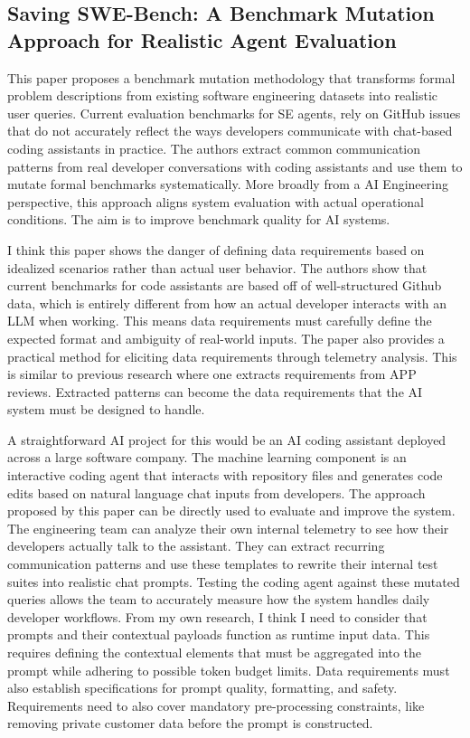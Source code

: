 \subsection{Saving SWE-Bench: A Benchmark Mutation Approach for Realistic Agent Evaluation~\cite{garg2026savingswebench}}
This paper proposes a benchmark mutation methodology that transforms formal problem descriptions from existing software engineering datasets into realistic user queries. Current evaluation benchmarks for SE agents, rely on GitHub issues that do not accurately reflect the ways developers communicate with chat-based coding assistants in practice. The authors extract common communication patterns from real developer conversations with coding assistants and use them to mutate formal benchmarks systematically. More broadly from a AI Engineering perspective, this approach aligns system evaluation with actual operational conditions. The aim is to improve benchmark quality for AI systems.

I think this paper shows the danger of defining data requirements based on idealized scenarios rather than actual user behavior. The authors show that current benchmarks for code assistants are based off of well-structured Github data, which is entirely different from how an actual developer interacts with an LLM when working. This means data requirements must carefully define the expected format and ambiguity of real-world inputs. The paper also provides a practical method for eliciting data requirements through telemetry analysis. This is similar to previous research where one extracts requirements from APP reviews. Extracted patterns can become the data requirements that the AI system must be designed to handle. 

A straightforward AI project for this would be an AI coding assistant deployed across a large software company. The machine learning component is an interactive coding agent that interacts with repository files and generates code edits based on natural language chat inputs from developers. The approach proposed by this paper can be directly used to evaluate and improve the system. The engineering team can analyze their own internal telemetry to see how their developers actually talk to the assistant. They can extract recurring communication patterns and use these templates to rewrite their internal test suites into realistic chat prompts. Testing the coding agent against these mutated queries allows the team to accurately measure how the system handles daily developer workflows. From my own research, I think I need to consider that prompts and their contextual payloads function as runtime input data. This requires defining the contextual elements that must be aggregated into the prompt while adhering to possible token budget limits. Data requirements must also establish specifications for prompt quality, formatting, and safety. Requirements need to also cover mandatory pre-processing constraints, like removing private customer data before the prompt is constructed. 

